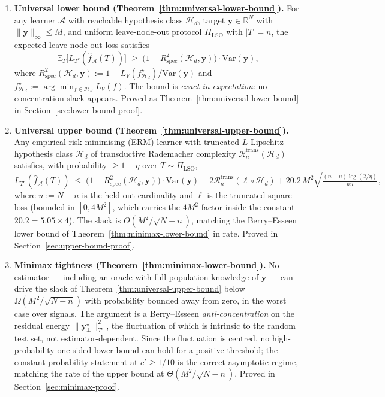 \documentclass[11pt,a4paper]{article}
\theoremstyle{plain}
\theoremstyle{definition}
\theoremstyle{remark}
\newcommand{\by}{\mathbf{y}}
\newcommand{\E}{\mathbb{E}}
\newcommand{\R}{\mathbb{R}}
\newcommand{\Var}{\mathrm{Var}}
\newcommand{\Rspec}{R^2_{\mathrm{spec}}}
\newcommand{\Acal}{\mathcal{A}}
\newcommand{\Hcal}{\mathcal{H}}
\begin{document}
\begin{enumerate}[label=(\arabic*),leftmargin=*]
\item \textbf{Universal lower bound
    (Theorem~\ref{thm:universal-lower-bound}).}  For any learner $\Acal$
    with reachable hypothesis class $\Hcal_d$, target $\by \in \R^N$
    with $\|\by\|_\infty \leq M$, and uniform leave-node-out protocol
    $\Pi_{\mathrm{LSO}}$ with $|T| = n$, the expected leave-node-out loss
    satisfies
    \begin{equation*}
        \E_T\!\big[L_{T^c}(\hat f_\Acal(T))\big] \;\geq\; \big(1 - \Rspec(\Hcal_d, \by)\big) \cdot \Var(\by),
    \end{equation*}
    where $\Rspec(\Hcal_d, \by) := 1 - L_V(f^\star_{\Hcal_d})/\Var(\by)$
    and $f^\star_{\Hcal_d} := \arg\min_{f \in \Hcal_d} L_V(f)$.  The
    bound is \emph{exact in expectation}: no concentration slack
    appears.  Proved as
    Theorem~\ref{thm:universal-lower-bound} in
    Section~\ref{sec:lower-bound-proof}.

\item \textbf{Universal upper bound
    (Theorem~\ref{thm:universal-upper-bound}).}  Any empirical-risk-minimising
    (ERM) learner with truncated $L$-Lipschitz hypothesis class $\Hcal_d$ of
    transductive Rademacher complexity $\mathcal{R}^{\mathrm{trans}}_n(\Hcal_d)$
    \citep{ElYanivPechyony2006} satisfies, with probability $\geq 1 -
    \eta$ over $T \sim \Pi_{\mathrm{LSO}}$,
    \begin{equation*}
        L_{T^c}(\hat f_\Acal(T))
        \;\leq\; \big(1 - \Rspec(\Hcal_d, \by)\big) \cdot \Var(\by)
            + 2 \mathcal{R}^{\mathrm{trans}}_n(\ell \circ \Hcal_d)
            + 20.2\, M^2 \sqrt{\tfrac{(n + u)\log(2/\eta)}{n u}},
    \end{equation*}
    where $u := N - n$ is the held-out cardinality and $\ell$ is the
    truncated square loss (bounded in $[0, 4M^2]$, which carries the
    $4M^2$ factor inside the constant $20.2 = 5.05 \times 4$).  The slack is $O(M^2/\sqrt{N - n})$,
    matching the Berry--Esseen lower bound of Theorem~\ref{thm:minimax-lower-bound}
    in rate.  Proved in Section~\ref{sec:upper-bound-proof}.

\item \textbf{Minimax tightness (Theorem~\ref{thm:minimax-lower-bound}).}
    No estimator --- including an oracle with full population knowledge
    of $\by$ --- can drive the slack of Theorem~\ref{thm:universal-upper-bound}
    below $\Omega(M^2/\sqrt{N-n})$ with probability bounded away from
    zero, in the worst case over signals.  The argument is a
    Berry--Esseen \emph{anti-concentration} on the residual energy
    $\|\by^\star_\perp\|^2_{T^c}$, the fluctuation of which is intrinsic
    to the random test set, not estimator-dependent.  Since the
    fluctuation is centred, no high-probability one-sided lower bound
    can hold for a positive threshold; the constant-probability
    statement at $c' \ge 1/10$ is the correct asymptotic regime,
    matching the rate of the upper bound at $\Theta(M^2/\sqrt{N-n})$.
    Proved in Section~\ref{sec:minimax-proof}.


\end{enumerate}
\end{document}
